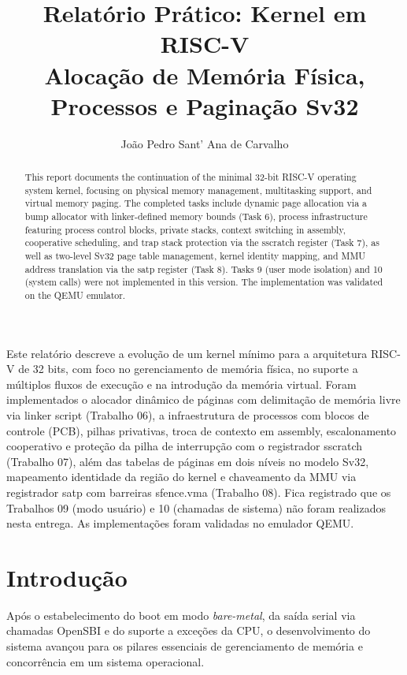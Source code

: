 \documentclass[12pt]{article}
\title{Relatório Prático: Kernel em RISC-V\\
\large Alocação de Memória Física, Processos e Paginação Sv32}
\author{João Pedro Sant' Ana de Carvalho}
\begin{document}
\maketitle

\begin{abstract}
This report documents the continuation of the minimal 32-bit RISC-V operating system kernel, focusing on physical memory management, multitasking support, and virtual memory paging. The completed tasks include dynamic page allocation via a bump allocator with linker-defined memory bounds (Task 6), process infrastructure featuring process control blocks, private stacks, context switching in assembly, cooperative scheduling, and trap stack protection via the sscratch register (Task 7), as well as two-level Sv32 page table management, kernel identity mapping, and MMU address translation via the satp register (Task 8). Tasks 9 (user mode isolation) and 10 (system calls) were not implemented in this version. The implementation was validated on the QEMU emulator.
\end{abstract}

\begin{resumo}
Este relatório descreve a evolução de um kernel mínimo para a arquitetura RISC-V de 32 bits, com foco no gerenciamento de memória física, no suporte a múltiplos fluxos de execução e na introdução da memória virtual. Foram implementados o alocador dinâmico de páginas com delimitação de memória livre via linker script (Trabalho 06), a infraestrutura de processos com blocos de controle (PCB), pilhas privativas, troca de contexto em assembly, escalonamento cooperativo e proteção da pilha de interrupção com o registrador sscratch (Trabalho 07), além das tabelas de páginas em dois níveis no modelo Sv32, mapeamento identidade da região do kernel e chaveamento da MMU via registrador satp com barreiras sfence.vma (Trabalho 08). Fica registrado que os Trabalhos 09 (modo usuário) e 10 (chamadas de sistema) não foram realizados nesta entrega. As implementações foram validadas no emulador QEMU.
\end{resumo}

\section{Introdução}

Após o estabelecimento do boot em modo \textit{bare-metal}, da saída serial via chamadas OpenSBI e do suporte a exceções da CPU, o desenvolvimento do sistema avançou para os pilares essenciais de gerenciamento de memória e concorrência em um sistema operacional.
\end{document}
